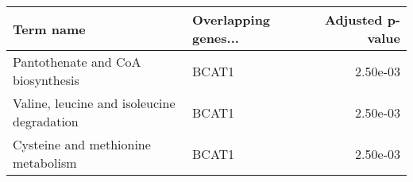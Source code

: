 \begin{tabular}{llr}
\toprule
                                 Term name & Overlapping genes... &  Adjusted p-value \\
\midrule
         Pantothenate and CoA biosynthesis &                BCAT1 &          2.50e-03 \\
Valine, leucine and isoleucine degradation &                BCAT1 &          2.50e-03 \\
        Cysteine and methionine metabolism &                BCAT1 &          2.50e-03 \\
\bottomrule
\end{tabular}
